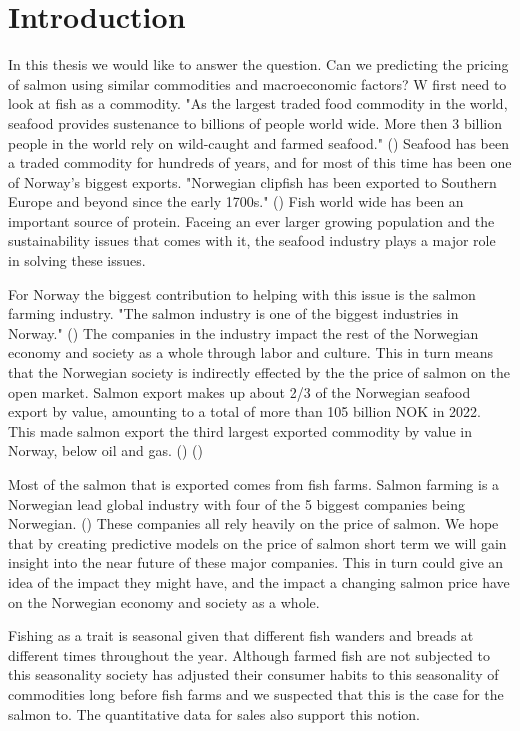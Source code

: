 \section{Introduction}

In this thesis we would like to answer the question. 
Can we predicting the pricing of salmon using similar commodities and macroeconomic factors? W first need to look at fish as a commodity. "As the largest traded food commodity in the world, seafood provides sustenance to billions of people world wide. More then 3 billion people in the world rely on wild-caught and farmed seafood." (\cite{wwf_2019}) Seafood has been a traded commodity for hundreds of years, and for most of this time has been one of Norway's biggest exports. "Norwegian clipfish has been exported to Southern Europe and beyond since the early 1700s." (\cite{seafood_from_norway_clipfish}) Fish world wide has been an important source of protein. Faceing an ever larger growing population and the sustainability issues that comes with it, the seafood industry plays a major role in solving these issues.

For Norway the biggest contribution to helping with this issue is the salmon farming industry. "The salmon industry is one of the biggest industries in Norway." (\cite{Johansen_et_al_2019}) The companies in the industry impact the rest of the Norwegian economy and society as a whole through labor and culture. This in turn means that the Norwegian society is indirectly effected by the the price of salmon on the open market. Salmon export makes up about 2/3 of the Norwegian seafood export by value, amounting to a total of more than 105 billion NOK in 2022. This made salmon export the third largest exported commodity by value in Norway, below oil and gas. (\cite{e24_gasprice_2023}) (\cite{seafood_nokkeltall})

Most of the salmon that is exported comes from fish farms. Salmon farming is a Norwegian lead global industry with four of the 5 biggest companies being Norwegian. (\cite{ilaks_2020}) These companies all rely heavily on the price of salmon. We hope that by creating predictive models on the price of salmon short term we will gain insight into the near future of these major companies. This in turn could give an idea of the impact they might have, and the impact a changing salmon price have on the Norwegian economy and society as a whole.

Fishing as a trait is seasonal given that different fish wanders and breads at different times throughout the year. Although farmed fish are not subjected to this seasonality society has adjusted their consumer habits to this seasonality of commodities long before fish farms and we suspected that this is the case for the salmon to. The quantitative data for sales also support this notion.

